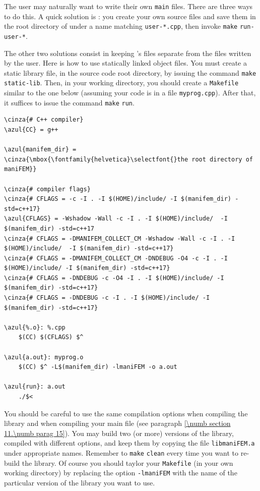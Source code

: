The user may naturally want to write their own {\small\tt main} files.
There are three ways to do this.
A quick solution is : you create your own source files and save them in the root directory
of {\maniFEM} under a name matching {\small\tt user-*.cpp},
then invoke {\small\tt make} {\small\tt run-user-*}.

The other two solutions consist in keeping \maniFEM's files separate from the files written
by the user.
Here is how to use statically linked object files.
You must create a static library file, in the {\maniFEM} source code root directory,
by issuing the command {\small\tt make} {\small\tt static-lib}.
Then, in your working directory, you should create a {\small\tt Makefile} similar to
the one below (assuming your code is in a file {\small\tt myprog.cpp}).
After that, it suffices to issue the command {\small\tt make} {\small\tt run}.

\begin{Verbatim}[commandchars=\\\{\},formatcom=\small\tt,frame=single,
   label=Makefile,rulecolor=\color{coment},
   baselinestretch=0.94,framesep=2mm                                            ]
\cinza{# C++ compiler}
\azul{CC} = g++

\azul{manifem_dir} = \cinza{\mbox{\fontfamily{helvetica}\selectfont{}the root directory of maniFEM}}

\cinza{# compiler flags}
\cinza{# CFLAGS = -c -I . -I $(HOME)/include/ -I $(manifem_dir) -std=c++17}
\azul{CFLAGS} = -Wshadow -Wall -c -I . -I $(HOME)/include/  -I $(manifem_dir) -std=c++17
\cinza{# CFLAGS = -DMANIFEM_COLLECT_CM -Wshadow -Wall -c -I . -I $(HOME)/include/  -I $(manifem_dir) -std=c++17}
\cinza{# CFLAGS = -DMANIFEM_COLLECT_CM -DNDEBUG -O4 -c -I . -I $(HOME)/include/ -I $(manifem_dir) -std=c++17}
\cinza{# CFLAGS = -DNDEBUG -c -O4 -I . -I $(HOME)/include/ -I $(manifem_dir) -std=c++17}
\cinza{# CFLAGS = -DNDEBUG -c -I . -I $(HOME)/include/ -I $(manifem_dir) -std=c++17}

\azul{%.o}: %.cpp
	$(CC) $(CFLAGS) $^

\azul{a.out}: myprog.o
	$(CC) $^ -L$(manifem_dir) -lmaniFEM -o a.out

\azul{run}: a.out
	./$<
\end{Verbatim}

You should be careful to use the same compilation options when compiling the library and
when compiling your main file (see paragraph \ref{\numb section 11.\numb parag 15}).
You may build two (or more) versions of the library, compiled with different options,
and keep them by copying the file {\small\tt libmaniFEM.a} under appropriate names.
Remember to {\small\tt make} {\small\tt clean} every time you want to re-build the library.
Of course you should taylor your {\small\tt Makefile} (in your own working directory)
by replacing the option {\small\tt -lmaniFEM} with the name of the particular version
of the library you want to use.

